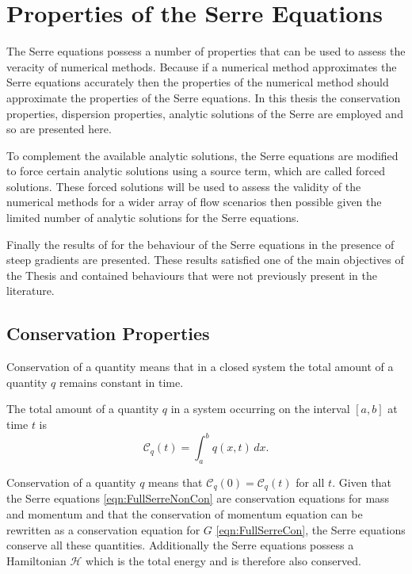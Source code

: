 \section{Properties of the Serre Equations}
The Serre equations possess a number of properties that can be used to assess the veracity of numerical methods. Because if a numerical method approximates the Serre equations accurately then the properties of the numerical method should approximate the properties of the Serre equations. In this thesis the conservation properties, dispersion properties, analytic solutions of the Serre are employed and so are presented here. 

To complement the available analytic solutions, the Serre equations are modified to force certain analytic solutions using a source term, which are called forced solutions. These forced solutions will be used to assess the validity of the numerical methods for a wider array of flow scenarios then possible given the limited number of analytic solutions for the Serre equations.

Finally the results of \citet{Pitt-2017-1725} for the behaviour of the Serre equations in the presence of steep gradients are presented. These results satisfied one of the main objectives of the Thesis and contained behaviours that were not previously present in the literature. 

\subsection{Conservation Properties}
Conservation of a quantity means that in a closed system the total amount of a quantity $q$ remains constant in time.
\begin{defn}
	\label{defn:TotalAmmountab}
	The total amount of a quantity $q$ in a system occurring on the interval $[a,b]$ at time $t$ is
	\begin{equation*}
	\mathcal{C}_q(t) = \int_{a}^{b} q(x,t)\, dx.
	\end{equation*}
\end{defn}
Conservation of a quantity $q$ means that $\mathcal{C}_{q}(0) = \mathcal{C}_{q}(t)$ for all $t$. Given that the Serre equations \eqref{eqn:FullSerreNonCon} are conservation equations for mass and momentum and that the conservation of momentum equation can be rewritten as a conservation equation for $G$ \eqref{eqn:FullSerreCon}, the Serre equations conserve all these quantities. Additionally the Serre equations possess a Hamiltonian $\mathcal{H}$ which is the total energy and is therefore also conserved.

